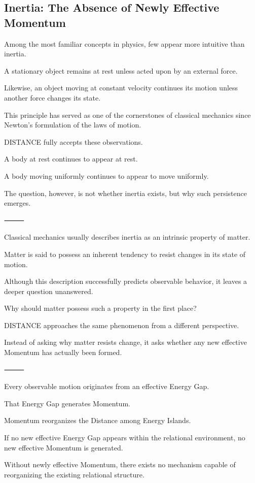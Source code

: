 \subsection*{\textbf{Inertia: The Absence of Newly Effective Momentum}}

Among the most familiar concepts in physics, few appear more intuitive than inertia.

A stationary object remains at rest unless acted upon by an external force.

Likewise, an object moving at constant velocity continues its motion unless another force changes its state.

This principle has served as one of the cornerstones of classical mechanics since Newton’s formulation of the laws of motion.

DISTANCE fully accepts these observations.

A body at rest continues to appear at rest.

A body moving uniformly continues to appear to move uniformly.

The question, however, is not whether inertia exists, but why such persistence emerges.

⸻

Classical mechanics usually describes inertia as an intrinsic property of matter.

Matter is said to possess an inherent tendency to resist changes in its state of motion.

Although this description successfully predicts observable behavior, it leaves a deeper question unanswered.

Why should matter possess such a property in the first place?

DISTANCE approaches the same phenomenon from a different perspective.

Instead of asking why matter resists change, it asks whether any new effective Momentum has actually been formed.

⸻

Every observable motion originates from an effective Energy Gap.

That Energy Gap generates Momentum.

Momentum reorganizes the Distance among Energy Islands.

If no new effective Energy Gap appears within the relational environment, no new effective Momentum is generated.

Without newly effective Momentum, there exists no mechanism capable of reorganizing the existing relational structure.

